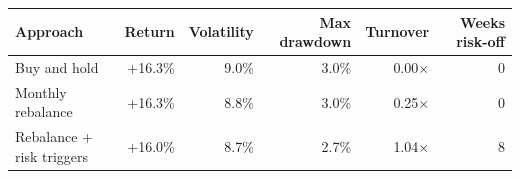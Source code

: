 \begin{tabular}{@{}lrrrrr@{}}
\toprule
\textbf{Approach} & \textbf{Return} & \textbf{Volatility} & \textbf{Max drawdown} & \textbf{Turnover} & \textbf{Weeks risk-off} \\
\midrule
Buy and hold & +16.3\% & 9.0\% & \textminus{}3.0\% & 0.00$\times$ & 0 \\
Monthly rebalance & +16.3\% & 8.8\% & \textminus{}3.0\% & 0.25$\times$ & 0 \\
Rebalance + risk triggers & +16.0\% & 8.7\% & \textminus{}2.7\% & 1.04$\times$ & 8 \\
\bottomrule
\end{tabular}